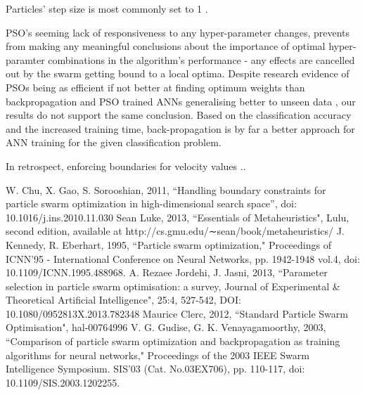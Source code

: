\documentclass[12pt]{article}
\begin{document}
Particles' step size is most commonly set to 1 \cite{Luke}.


PSO's seeming lack of responsiveness to any hyper-parameter changes, prevents from making any meaningful conclusions about the importance of optimal hyper-paramter combinations in the algorithm's performance - any effects are cancelled out by the swarm getting bound to a local optima. Despite research evidence of PSOs being as efficient if not better at finding optimum weights than backpropagation and PSO trained ANNs generalising better to unseen data \cite{Kennedy}, our results do not support the same conclusion. Based on the classification accuracy and the increased training time, back-propagation is by far a better approach for ANN training for the given classification problem.

In retrospect, enforcing boundaries for velocity values ..

\vspace{-1.5em}
\begin{thebibliography}{10}

 W. Chu, X. Gao, S. Sorooshian, 2011, ``Handling boundary constraints for particle swarm optimization in high-dimensional search space'', doi: 10.1016/j.ins.2010.11.030
 Sean Luke, 2013, ``Essentials of Metaheuristics", Lulu, second edition, available at http://cs.gmu.edu/∼sean/book/metaheuristics/
 J. Kennedy, R. Eberhart, 1995, ``Particle swarm optimization," Proceedings of ICNN'95 - International Conference on Neural Networks,  pp. 1942-1948 vol.4, doi: 10.1109/ICNN.1995.488968.
 A. Rezaee Jordehi, J. Jasni, 2013, ``Parameter selection in particle swarm optimisation: a survey, Journal of Experimental \& Theoretical Artificial Intelligence", 25:4, 527-542, DOI: 10.1080/0952813X.2013.782348
 Maurice Clerc, 2012, ``Standard Particle Swarm Optimisation", hal-00764996
  V. G. Gudise, G. K. Venayagamoorthy, 2003, ``Comparison of particle swarm optimization and backpropagation as training algorithms for neural networks," Proceedings of the 2003 IEEE Swarm Intelligence Symposium. SIS'03 (Cat. No.03EX706), pp. 110-117, doi: 10.1109/SIS.2003.1202255.


\end{thebibliography}
\end{document}
